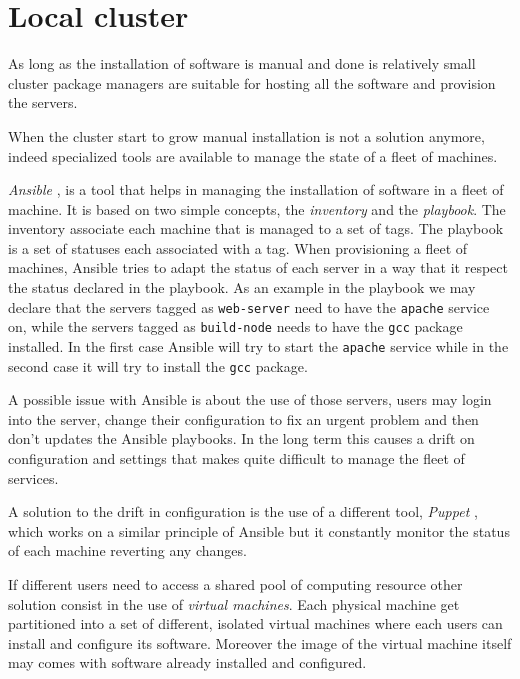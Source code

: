 \section{Local cluster}

As long as the installation of software is manual and done is relatively small
cluster package managers are suitable for hosting all the software and
provision the servers.

When the cluster start to grow manual installation is not a solution anymore,
indeed specialized tools are available to manage the state of a fleet of
machines.

\textit{Ansible} \cite{ansible}, \cite{provisioning} is a tool that helps in
managing the installation of software in a fleet of machine. It is based on two
simple concepts, the \textit{inventory} and the \textit{playbook}. The
inventory associate each machine that is managed to a set of tags. The playbook
is a set of statuses each associated with a tag. When provisioning a fleet of
machines, Ansible tries to adapt the status of each server in a way that it
respect the status declared in the playbook. As an example in the playbook we
may declare that the servers tagged as \texttt{web-server} need to have the
\texttt{apache} service on, while the servers tagged as \texttt{build-node}
needs to have the \texttt{gcc} package installed. In the first case Ansible
will try to start the \texttt{apache} service while in the second case it will
try to install the \texttt{gcc} package.

A possible issue with Ansible is about the use of those servers, users may
login into the server, change their configuration to fix an urgent problem and
then don't updates the Ansible playbooks. In the long term this causes a drift
on configuration and settings that makes quite difficult to manage the fleet of
services.

A solution to the drift in configuration is the use of a different tool,
\textit{Puppet} \cite{puppet}, \cite{provisioning} which works on a similar
principle of Ansible but it constantly monitor the status of each machine
reverting any changes.

If different users need to access a shared pool of computing resource other
solution consist in the use of \textit{virtual machines}. Each physical machine
get partitioned into a set of different, isolated virtual machines where each
users can install and configure its software. Moreover the image of the virtual
machine itself may comes with software already installed and configured.

